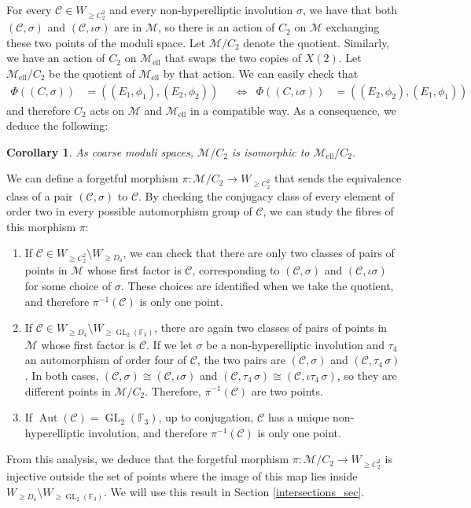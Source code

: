 \documentclass{amsart}
\newcommand{\calC}{\mathcal{C}}
\newcommand{\calM}{\mathcal{M}}
\DeclareMathOperator{\Aut}{Aut}
\newcommand{\GL}{\operatorname{GL}}
\newcommand{\mell}{\mathcal{M}_{\text{ell}}}
\newcommand{\mells}{\mathcal{M}_{\text{ell}}/C_2}
\newcommand{\mquot}{\mathcal{M}/C_2}
\numberwithin{equation}{section}
\newtheorem{corollary}[theorem]{Corollary}
\theoremstyle{definition}
\theoremstyle{remark}
\begin{document}
For every $\calC\in W_{\geq C_2^2}$ and every non-hyperelliptic involution $\sigma$, we have that both $(\calC,\sigma)$ and $(\calC,\iota\sigma)$ are in $\calM$, so there is an action of $C_2$ on $\calM$ exchanging these two points of the moduli space. Let $\mquot$ denote the quotient. Similarly, we have an action of $C_2$ on $\mell$ that swaps the two copies of $X(2)$. Let $\mells$ be the quotient of $\mell$ by that action. We can easily check that 
\begin{align*}
\Phi((C,\sigma))&=((E_1,\phi_1),(E_2,\phi_2))& &\Longleftrightarrow& \Phi((C,\iota\sigma))&=((E_2,\phi_2),(E_1,\phi_1))
\end{align*}
and therefore $C_2$ acts on $\calM$ and $\mell$ in a compatible way. As a consequence, we deduce the following:
\begin{corollary}
As coarse moduli spaces, $\mquot$ is isomorphic to $\mells$.
\end{corollary}
We can define a forgetful morphism $\pi:\mquot\rightarrow W_{\geq C_2^2}$ that sends the equivalence class of a pair $(\calC,\sigma)$ to $\calC$. By checking the conjugacy class of every element of order two in every possible automorphism group of $\calC$, we can study the fibres of this morphism $\pi$:
\begin{enumerate}
    \item If $\calC\in W_{\geq C_2^2}\setminus W_{\geq D_4} $, we can check that there are only two classes of pairs of points in $\calM$ whose first factor is $\calC$, corresponding to $(\calC,\sigma)$ and $(\calC,\iota\sigma)$ for some choice of $\sigma$. These choices are identified when we take the quotient, and therefore $\pi^{-1}(\calC)$ is only one point.
    \item If $\calC\in W_{\geq D_4}\setminus W_{\geq \GL_2(\mathbb{F}_3)}$, there are again two classes of pairs of points in $\calM$ whose first factor is $\calC$. If we let $\sigma$ be a non-hyperelliptic involution and $\tau_4$ an automorphism of order four of $\calC$, the two pairs are $(\calC,\sigma)$ and $(\calC,\tau_4\,\sigma)$. In both cases, $(\calC,\sigma)\cong(\calC,\iota\sigma)$ and $(\calC,\tau_4\,\sigma)\cong(\calC,\iota\tau_4\,\sigma)$, so they are different points in $\mquot$. Therefore, $\pi^{-1}(\calC)$ are two points.
    \item If $\Aut(\calC)=\GL_2(\mathbb{F}_3)$, up to conjugation, $\calC$ has a unique non-hyperelliptic involution, and therefore $\pi^{-1}(\calC)$ is only one point. 
    
\end{enumerate}
From this analysis, we deduce that the forgetful morphism $\pi: \mquot\rightarrow W_{\geq C_2^2}$ is injective outside the set of points where the image of this map lies inside $W_{\geq D_4}\setminus W_{\geq \GL_2(\mathbb{F}_3)}$. We will use this result in Section \ref{intersections_sec}.\\
\end{document}
